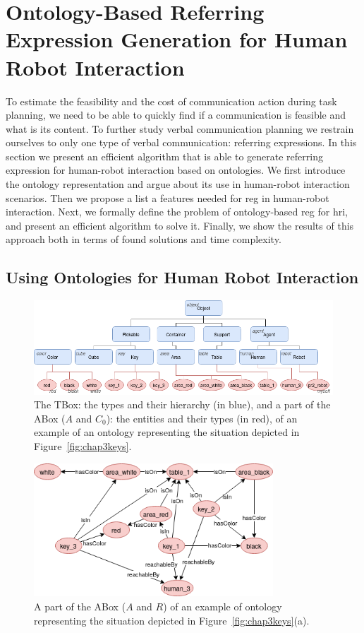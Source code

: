 \documentclass[a4paper,11pt,twoside]{StyleThese}
\begin{document}
\section[Referring Expression Generation for HRI]{Ontology-Based Referring Expression Generation for Human Robot Interaction}
To estimate the feasibility and the cost of communication action during task planning, we need to be able to quickly find if a communication is feasible and what is its content. To further study verbal communication planning we restrain ourselves to only one type of verbal communication: referring expressions.
In this section we present an efficient algorithm that is able to generate referring expression for human-robot interaction based on ontologies. We first introduce the ontology representation and argue about its use in human-robot interaction scenarios. Then we propose a list a features needed for \acrshort{reg} in human-robot interaction. Next, we formally define the problem of ontology-based \acrshort{reg} for \acrshort{hri}, and present an efficient algorithm to solve it. Finally, we show the results of this approach both in terms of found solutions and time complexity.

\subsection{Using Ontologies for Human Robot Interaction}
\begin{figure}[hbtp]
\centering
\includegraphics[width=\textwidth]{figures/chapter3/AboxTbox.png}
\caption{The TBox: the types and their hierarchy (in blue), and a part of the ABox ($A$ and $C_0$): the entities and their types (in red), of an example of an ontology representing the situation depicted in Figure~\ref{fig:chap3keys}.}
\label{fig:chap3aboxtbox}
\end{figure}

\begin{figure}[hbtp]
\centering
\includegraphics[width=0.8\textwidth]{figures/chapter3/ABoxR.png}
\caption{A part of the ABox ($A$ and $R$) of an example of ontology representing the situation depicted in Figure~\ref{fig:chap3keys}(a).}
\label{fig:chap3aboxrel}
\end{figure}
\end{document}
